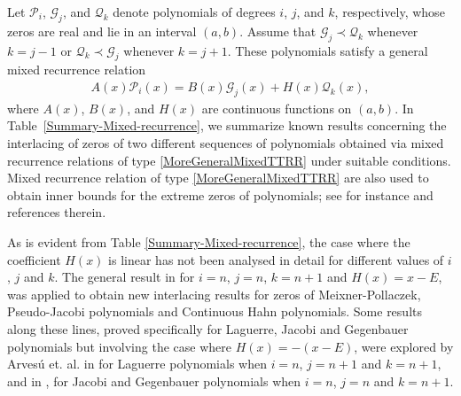 \documentclass[final,3p,times,12pt]{elsarticle}
\numberwithin{equation}{section}  %
\begin{document}
Let $\mathcal{P}_i$, $\mathcal{G}_j$, and $\mathcal{Q}_k$ denote polynomials of degrees $i$, $j$, and $k$, respectively, whose zeros are  real and  lie in an interval $(a,b)$. Assume that $\mathcal{G}_j \prec \mathcal{Q}_k$ whenever $k=j-1$ or $\mathcal{Q}_k \prec \mathcal{G}_j$ whenever $k=j+1$. These polynomials satisfy a general mixed recurrence relation
\begin{align}\label{MoreGeneralMixedTTRR}
	A(x)\mathcal{P}_i(x)=B(x)\mathcal{G}_j(x)+H(x)\mathcal{Q}_k(x),
\end{align}
where $A(x)$, $B(x)$, and $H(x)$ are continuous functions on $(a,b)$. In Table~\ref{Summary-Mixed-recurrence}, we summarize known results concerning the interlacing of zeros of two different sequences of polynomials obtained via mixed recurrence relations of type \eqref{MoreGeneralMixedTTRR} under suitable conditions.   Mixed recurrence relation of type \eqref{MoreGeneralMixedTTRR} are also used to obtain inner bounds for the extreme zeros of polynomials; see for instance \cite{Jooste-Jordaan-Extremezero-MP-JAT-2025} and references therein. 

As is evident from Table \ref{Summary-Mixed-recurrence}, the case where the coefficient $H(x)$ is linear has not been analysed in detail for different values of $i$, $j$ and $k$. The general result in \cite{Jooste-Jordaan-Numeralg-2025} for $i=n$, $j=n$, $k=n+1$ and $H(x)=x-E$, was applied to obtain new interlacing results for zeros of Meixner-Pollaczek, Pseudo-Jacobi polynomials and Continuous Hahn polynomials. Some results along these lines, proved specifically for Laguerre, Jacobi and Gegenbauer polynomials but involving the case where $H(x)=-(x-E)$, were explored by Arves\'u et. al. in \cite{Arvesu-Driver-Littlejohn-ITSF-2021} for Laguerre polynomials when $i=n$, $j=n+1$ and $k=n+1$, and in \cite{Arvesu-Driver-Littlejohn-RamanujanJ-2023}, for Jacobi and Gegenbauer polynomials when $i=n$, $j=n$ and $k=n+1$.
\end{document}
